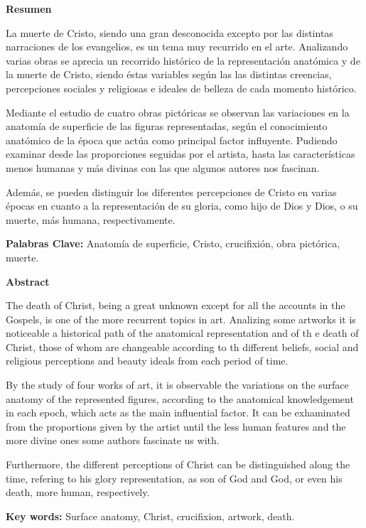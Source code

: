 \textbf{Resumen}

La muerte de Cristo, siendo una gran desconocida excepto por las distintas narraciones de los evangelios, es un tema muy recurrido en el arte. Analizando varias obras se aprecia un recorrido histórico de la representación anatómica y de la muerte de Cristo, siendo éstas variables según las las distintas creencias, percepciones sociales y religiosas e ideales de belleza de cada momento histórico.

Mediante el estudio de cuatro obras pictóricas se observan las variaciones en la anatomía de superficie de las figuras representadas, según el conocimiento anatómico de la época que actúa como principal factor influyente. Pudiendo examinar desde las proporciones seguidas por el artista, hasta las características menos humanas y más divinas con las que algunos autores nos fascinan.

Además, se pueden distinguir los diferentes percepciones de Cristo en varias épocas en cuanto a la representación de su gloria, como hijo de Dios y Dios, o su muerte, más humana, respectivamente.

\vspace{15pt}

\textbf{Palabras Clave:}
Anatomía de superficie, Cristo, crucifixión, obra pictórica, muerte.

\vspace{30pt}

\textbf{Abstract}

The death of Christ, being a great unknown except for all the accounts in the Gospels, is one of the more recurrent topics in art. Analizing some artworks it is noticeable a historical path of the anatomical representation and of th e death of Christ, those of whom are changeable according to th different beliefs, social and religious perceptions and beauty ideals from each period of time.

By the study of four works of art, it is observable the variations on the surface anatomy of the represented figures, according to the anatomical knowledgement in each epoch, which acts as the main influential factor. It can be exhaminated from the proportions given by the artist until the less human features and the more divine ones some authors fascinate us with.

Furthermore, the different perceptions of Christ can be distinguished  along the time, refering to his glory representation, as son of God and God, or even his death, more human, respectively.

\vspace{15pt}

\textbf{Key words:}
Surface anatomy, Christ, crucifixion, artwork, death.